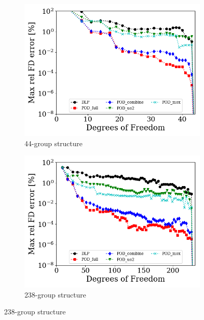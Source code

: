 \documentclass[5p,times,twocolumn,10pt]{elsarticle}
\begin{document}
    \begin{figure}[!htbp]
        \centering
        \begin{subfigure}[b]{\columnwidth}
            \centering
            \includegraphics[scale=0.55]{figures/max_fission_error_44}
            \caption{44-group structure}
            \label{fig:maxFD44}
        \end{subfigure}
        \hfill
        \begin{subfigure}[b]{\columnwidth}
            \centering
            \includegraphics[scale=0.55]{figures/max_fission_error_238}
            \caption{238-group structure}
            \label{fig:maxFD238}
        \end{subfigure}
        \hfill

\end{figure}
\end{document}
